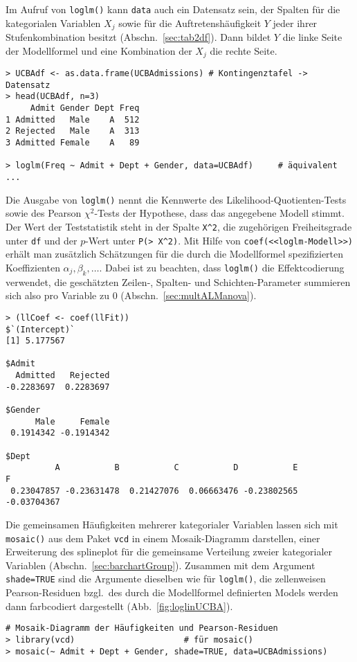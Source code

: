 Im Aufruf von \lstinline!loglm()! kann \lstinline!data! auch ein Datensatz sein, der Spalten für die kategorialen Variablen $X_{j}$ sowie für die Auftretenshäufigkeit $Y$ jeder ihrer Stufenkombination besitzt (Abschn.\ \ref{sec:tab2df}). Dann bildet $Y$ die linke Seite der Modellformel und eine Kombination der $X_{j}$ die rechte Seite.
\begin{lstlisting}
> UCBAdf <- as.data.frame(UCBAdmissions) # Kontingenztafel -> Datensatz
> head(UCBAdf, n=3)
     Admit Gender Dept Freq
1 Admitted   Male    A  512
2 Rejected   Male    A  313
3 Admitted Female    A   89

> loglm(Freq ~ Admit + Dept + Gender, data=UCBAdf)     # äquivalent ...
\end{lstlisting}

Die Ausgabe von \lstinline!loglm()! nennt die Kennwerte des Likelihood-Quotienten-Tests sowie des Pearson $\chi^{2}$-Tests der Hypothese, dass das angegebene Modell stimmt. Der Wert der Teststatistik steht in der Spalte \lstinline!X^2!, die zugehörigen Freiheitsgrade unter \lstinline!df! und der $p$-Wert unter \lstinline!P(> X^2)!. Mit Hilfe von \lstinline!coef(<<loglm-Modell>>)! erhält man zusätzlich Schätzungen für die durch die Modellformel spezifizierten Koeffizienten $\alpha_{j}, \beta_{k}, \ldots$. Dabei ist zu beachten, dass \lstinline!loglm()! die Effektcodierung verwendet, die geschätzten Zeilen-, Spalten- und Schichten-Parameter summieren sich also pro Variable zu $0$ (Abschn.\ \ref{sec:multALManova}).
\begin{lstlisting}
> (llCoef <- coef(llFit))
$`(Intercept)`
[1] 5.177567

$Admit
  Admitted   Rejected
-0.2283697  0.2283697

$Gender
      Male     Female
 0.1914342 -0.1914342

$Dept
          A           B           C           D           E           F
 0.23047857 -0.23631478  0.21427076  0.06663476 -0.23802565 -0.03704367
\end{lstlisting}

Die gemeinsamen Häufigkeiten mehrerer kategorialer Variablen lassen sich mit  \lstinline!mosaic()! aus dem Paket \lstinline!vcd! in einem Mosaik-Diagramm darstellen, einer Erweiterung des splineplot für die gemeinsame Verteilung zweier kategorialer Variablen (Abschn.\ \ref{sec:barchartGroup}). Zusammen mit dem Argument \lstinline!shade=TRUE! sind die Argumente dieselben wie für \lstinline!loglm()!, die zellenweisen Pearson-Residuen bzgl.\ des durch die Modellformel definierten Models werden dann farbcodiert dargestellt (Abb.\ \ref{fig:loglinUCBA}).
\begin{lstlisting}
# Mosaik-Diagramm der Häufigkeiten und Pearson-Residuen
> library(vcd)                      # für mosaic()
> mosaic(~ Admit + Dept + Gender, shade=TRUE, data=UCBAdmissions)
\end{lstlisting}

